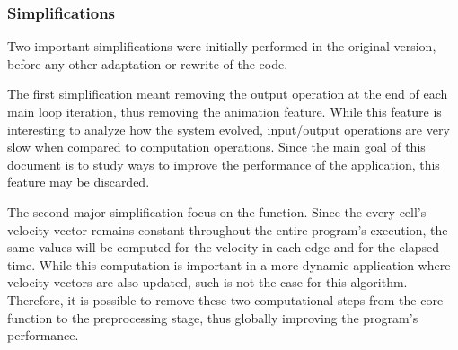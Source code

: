 \subsubsection{Simplifications}

Two important simplifications were initially performed in the original version, before any other adaptation or rewrite of the code.

The first simplification meant removing the output operation at the end of each main loop iteration, thus removing the animation feature. While this feature is interesting to analyze how the system evolved, input/output operations are very slow when compared to computation operations. Since the main goal of this document is to study ways to improve the performance of the \polu application, this feature may be discarded.

The second major simplification focus on the \computeflux function. Since the every cell's velocity vector remains constant throughout the entire program's execution, the same values will be computed for the velocity in each edge and for the elapsed time. While this computation is important in a more dynamic application where velocity vectors are also updated, such is not the case for this algorithm. Therefore, it is possible to remove these two computational steps from the core function to the preprocessing stage, thus globally improving the program's performance.